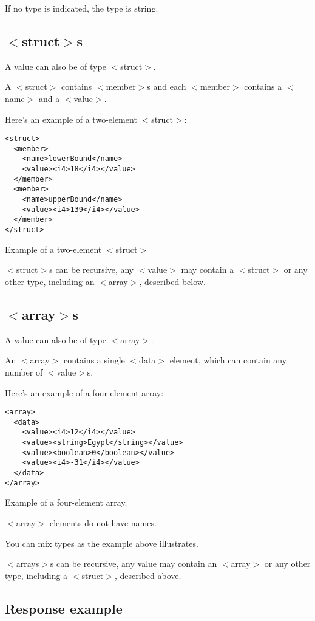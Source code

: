 If no type is indicated, the type is string.

\subsection{$<$struct$>$s}

A value can also be of type $<$struct$>$.

A $<$struct$>$ contains $<$member$>$s and each $<$member$>$ contains a $<$name$>$ and a $<$value$>$.

Here's an example of a two-element $<$struct$>$:
\begin{code}
\begin{verbatim}
<struct>
  <member>
    <name>lowerBound</name>
    <value><i4>18</i4></value>
  </member>
  <member>
    <name>upperBound</name>
    <value><i4>139</i4></value>
  </member>
</struct>
\end{verbatim}
\caption{Example of a two-element $<$struct$>$}
\end{code}

$<$struct$>$s can be recursive, any $<$value$>$ may contain a $<$struct$>$ or any other type, including an $<$array$>$, described below.
\subsection{$<$array$>$s}

A value can also be of type $<$array$>$.

An $<$array$>$ contains a single $<$data$>$ element, which can contain any number of $<$value$>$s.

Here's an example of a four-element array:
\begin{code}
\begin{verbatim}
<array>
  <data>
    <value><i4>12</i4></value>
    <value><string>Egypt</string></value>
    <value><boolean>0</boolean></value>
    <value><i4>-31</i4></value>
  </data>
</array>
\end{verbatim}
\caption{Example of a four-element array.}
\end{code}

$<$array$>$ elements do not have names.

You can mix types as the example above illustrates.

$<$arrays$>$s can be recursive, any value may contain an $<$array$>$ or any other type, including a $<$struct$>$, described above.
\subsection{Response example}

